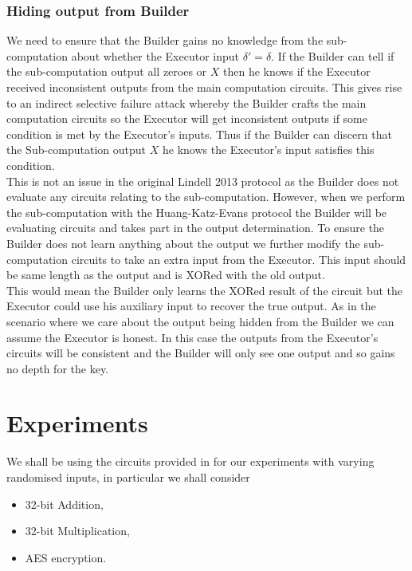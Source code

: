 \documentclass[ %
                    author={Nicholas Tutte},
                supervisor={Prof. Nigel Smart},
                    degree={MEng},
                     title={Secure Two Party Computation},
                  subtitle={A practical comparison of recent protocols},
                      type={Research - GG1K},
                      year={2015} ]{dissertation}
\begin{document}
			\subsection{Hiding output from Builder}
				We need to ensure that the Builder gains no knowledge from the sub-computation about whether the Executor input $\delta' = \delta$. If the Builder can tell if the sub-computation output all zeroes or $X$ then he knows if the Executor received inconsistent outputs from the main computation circuits. This gives rise to an indirect selective failure attack whereby the Builder crafts the main computation circuits so the Executor will get inconsistent outputs if some condition is met by the Executor's inputs. Thus if the Builder can discern that the Sub-computation output $X$ he knows the Executor's input satisfies this condition.\\

				This is not an issue in the original Lindell 2013 protocol as the Builder does not evaluate any circuits relating to the sub-computation. However, when we perform the sub-computation with the Huang-Katz-Evans protocol the Builder will be evaluating circuits and takes part in the output determination. To ensure the Builder does not learn anything about the output we further modify the sub-computation circuits to take an extra input from the Executor. This input should be same length as the output and is XORed with the old output.\\

				This would mean the Builder only learns the XORed result of the circuit but the Executor could use his auxiliary input to recover the true output. As in the scenario where we care about the output being hidden from the Builder we can assume the Executor is honest. In this case the outputs from the Executor's circuits will be consistent and the Builder will only see one output and so gains no depth for the key.\\


	\chapter{Experiments} \label{sec:Results}
		We shall be using the circuits provided in \cite{NigelCircuits} for our experiments with varying randomised inputs, in particular we shall consider
		
		\begin{itemize}
			\item 32-bit Addition,
			\item 32-bit Multiplication,
			\item AES encryption.
		\end{itemize}
\end{document}
